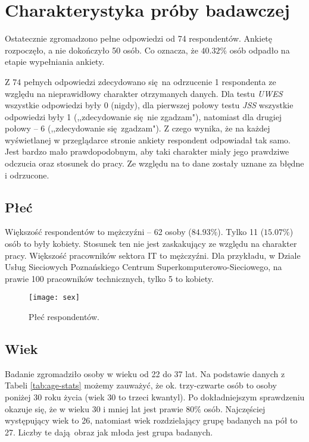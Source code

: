 \section{Charakterystyka próby badawczej} 
Ostatecznie zgromadzono pełne odpowiedzi od 74 respondentów. Ankietę rozpoczęło, a nie dokończyło 50 osób. Co oznacza, że $40.32\%$ osób odpadło na etapie wypełniania ankiety. 

Z 74 pełnych odpowiedzi zdecydowano się na odrzucenie 1 respondenta ze względu na nieprawidłowy charakter otrzymanych danych. Dla testu \emph{UWES} wszystkie odpowiedzi były 0 (nigdy), dla pierwszej połowy testu \emph{JSS} wszystkie odpowiedzi były 1 (,,zdecydowanie się nie zgadzam"), natomiast dla drugiej połowy -- 6 (,,zdecydowanie się zgadzam"). Z czego wynika, że na każdej wyświetlanej w przeglądarce stronie ankiety respondent odpowiadał tak samo. Jest bardzo mało
prawdopodobnym, aby taki charakter miały jego prawdziwe odczucia oraz stosunek do pracy. Ze względu na to dane zostały uznane za błędne i odrzucone.
\subsection{Płeć}
Większość respondentów to mężczyźni -- 62 osoby ($84.93\%$). Tylko 11 ($15.07\%$) osób to były kobiety. Stosunek ten nie jest zaskakujący ze względu na charakter pracy. Większość pracowników sektora IT to mężczyźni. Dla przykładu, w Dziale Usług Sieciowych Poznańskiego Centrum Superkomputerowo-Sieciowego, na prawie 100 pracowników technicznych, tylko 5 to kobiety.

\begin{figure}[h]
\begin{center}
\texttt{[image: sex]}
\end{center}
\caption{Płeć respondentów.}
\label{fig:sex}
\end{figure}

\subsection{Wiek}
Badanie zgromadziło osoby w wieku od 22 do 37 lat. Na podstawie danych z Tabeli \ref{tab:age-stats} możemy zauważyć, że ok. trzy-czwarte osób to osoby poniżej 30 roku życia (wiek 30 to trzeci kwantyl). Po dokładniejszym sprawdzeniu okazuje się, że w wieku 30 i mniej lat jest prawie $80\%$ osób.  Najczęściej występujący wiek to 26, natomiast wiek rozdzielający grupę badanych na pół to 27. Liczby te dają obraz jak młoda jest grupa badanych. 

